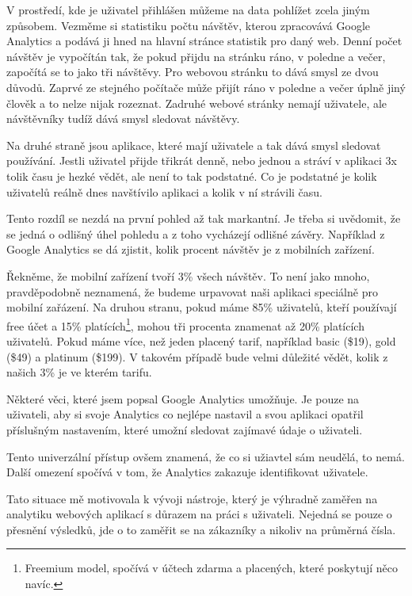 \documentclass[bc,male,java,dept456]{diploma}						%
\begin{document}
V prostředí, kde je uživatel přihlášen můžeme na data pohlížet zcela jiným způsobem. Vezměme si statistiku počtu návštěv, kterou zpracovává Google Analytics a podává ji hned na hlavní stránce statistik pro daný web. Denní počet návštěv je vypočítán tak, že pokud přijdu na stránku ráno, v poledne a večer, započítá se to jako tři návštěvy. Pro webovou stránku to dává smysl ze dvou důvodů. Zaprvé ze stejného počítače může přijít ráno v poledne a večer úplně jiný člověk a to nelze nijak rozeznat. Zadruhé webové stránky nemají uživatele, ale návštěvníky tudíž dává smysl sledovat návštěvy. 

Na druhé straně jsou aplikace, které mají uživatele a tak dává smysl sledovat používání. Jestli uživatel přijde třikrát denně, nebo jednou a stráví v aplikaci 3x tolik času je hezké vědět, ale není to tak podstatné. Co je podstatné je kolik uživatelů reálně dnes navštívilo aplikaci a kolik v ní strávili času.

Tento rozdíl se nezdá na první pohled až tak markantní. Je třeba si uvědomit, že se jedná o odlišný úhel pohledu a z toho vycházejí odlišné závěry. Například z Google Analytics se dá zjistit, kolik procent návštěv je z mobilních zařízení. 

Řekněme, že mobilní zařízení tvoří 3\% všech návštěv. To není jako mnoho, pra\-vdě\-po\-do\-bně neznamená, že budeme urpavovat naši aplikaci speciálně pro mobilní zařázení. Na druhou stranu, pokud máme 85\% uživatelů, kteří používají free účet a 15\% platících\footnote{Freemium model, spočívá v účtech zdarma a placených, které poskytují něco navíc.}, mohou tři procenta znamenat až 20\% platících uživatelů. Pokud máme více, než jeden placený tarif, například basic (\$19), gold (\$49) a platinum (\$199). V takovém případě bude velmi důležité vědět, kolik z našich 3\% je ve kterém tarifu.

Některé věci, které jsem popsal Google Analytics umožňuje. Je pouze na uživateli, aby si svoje Analytics co nejlépe nastavil a svou aplikaci opatřil příslušným nastavením, které umožní sledovat zajímavé údaje o uživateli.

Tento univerzální přístup ovšem znamená, že co si užiavtel sám neudělá, to nemá. Další omezení spočívá v tom, že Analytics zakazuje identifikovat uživatele.

Tato situace mě motivovala k vývoji nástroje, který je výhradně zaměřen na analytiku webových aplikací s důrazem na práci s uživateli. Nejedná se pouze o přesnění výsledků, jde o to zaměřit se na zákazníky a nikoliv na průměrná čísla.
\end{document}
